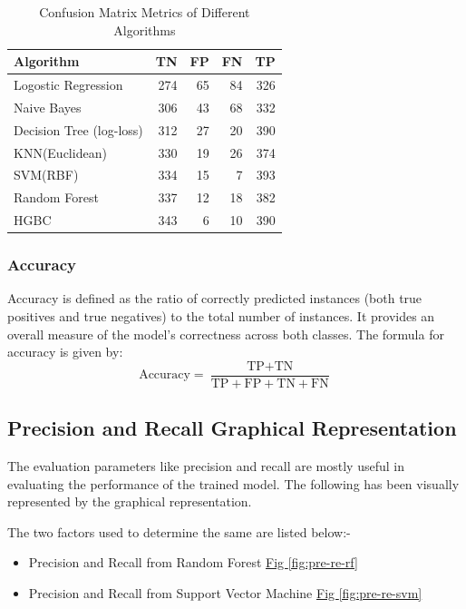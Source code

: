 \documentclass[pdflatex,sn-nature]{sn-jnl}
\theoremstyle{thmstyleone}%
\theoremstyle{thmstyletwo}%
\theoremstyle{thmstylethree}%
\begin{document}
\begin{table}[ht]
    \centering
    \caption{Confusion Matrix Metrics of Different Algorithms}
    \label{tab:algorithm_metrics}
    \begin{tabular}{lrrrr}
        \toprule
        \textbf{Algorithm} & \textbf{TN} & \textbf{FP} & \textbf{FN} & \textbf{TP} \\
        \midrule
        Logostic Regression & 274 & 65 & 84 & 326 \\
        Naive Bayes & 306 & 43 & 68 & 332 \\
        Decision Tree (log-loss) & 312 & 27 & 20 & 390 \\
        KNN(Euclidean) & 330 & 19 & 26 & 374 \\
        SVM(RBF) & 334 & 15 & 7 & 393 \\
        Random Forest & 337 & 12 & 18 & 382 \\
        HGBC & 343 & 6 & 10 & 390 \\
        \bottomrule
    \end{tabular}
\end{table}

\subsubsection{Accuracy}\label{sec:accuracy}

Accuracy is defined as the ratio of correctly predicted instances (both true positives and true negatives) to the total number of instances. It provides an overall measure of the model's correctness across both classes. The formula for accuracy is given by:
\begin{equation}
    \text{Accuracy} = \frac{\text{TP} + \text{TN}}{\text{TP} + \text{FP} + \text{TN} + \text{FN}}
    \label{eq:acc}
\end{equation}

\subsection{Precision and Recall Graphical Representation}\label{sec:precision_recall}

The evaluation parameters like precision and recall are mostly useful in evaluating the performance of the trained model. The following has been visually represented by the graphical representation. 

The two factors used to determine the same are listed below:- 

\begin{itemize}
    \item Precision and Recall from Random Forest \hyperref[Fig. 3]{Fig \ref{fig:pre-re-rf}}
    \item Precision and Recall from Support Vector Machine \hyperref[Fig. 4]{Fig \ref{fig:pre-re-svm}}
\end{itemize}
\end{document}
